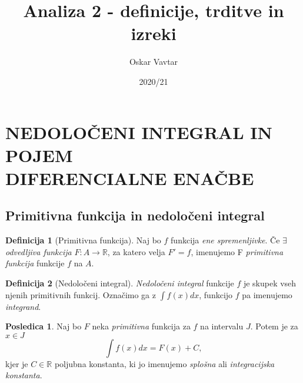 \documentclass[11pt]{article}
\title{Analiza 2 - definicije, trditve in izreki}
\author{Oskar Vavtar}
\date{2020/21}
\theoremstyle{definition}
\newtheorem{definicija}{Definicija}[section]
\newtheorem*{posledica}{Posledica}
\begin{document}
\maketitle
\pagebreak
\tableofcontents
\pagebreak


\section{NEDOLOČENI INTEGRAL IN POJEM \\ DIFERENCIALNE ENAČBE}
\vspace{0.5cm}


\subsection{Primitivna funkcija in nedoločeni integral}
\vspace{0.5cm}

\begin{definicija}[Primitivna funkcija]

Naj bo $f$ funkcija \textit{ene spremenljivke}. Če $\exists$ \textit{odvedljiva funkcija} $F: A \rightarrow \mathbb{R}$, za katero velja $F' = f$, imenujemo F \textit{primitivna funkcija} funkcije $f$ na $A$. 

\end{definicija}
\vspace{0.5cm}

\begin{definicija}[Nedoločeni integral]

\textit{Nedoločeni integral} funkcije $f$ je skupek vseh njenih primitivnih funkcij. Označimo ga z $\int f(x) dx$, funkcijo $f$ pa imenujemo \textit{integrand}.

\end{definicija}

\begin{posledica}

Naj bo $F$ neka \textit{primitivna} funkcija za $f$ na intervalu $J$. Potem je za $x \in J$
$$\int f(x) dx = F(x) + C,$$
kjer je $C \in \mathbb{R}$ poljubna konstanta, ki jo imenujemo \textit{splošna} ali \textit{integracijska konstanta}.

\end{posledica}
\vspace{0.5cm}
\end{document}
